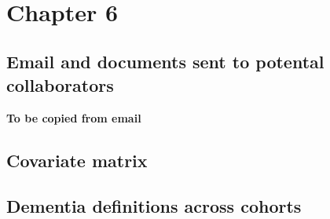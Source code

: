 \documentclass[a4paper, twoside]{templates/ociamthesis}
\begin{document}
~

\hypertarget{appendix-ipd-analysis}{%
\section{Chapter 6}\label{appendix-ipd-analysis}}

\hypertarget{ipd-email-collab}{%
\subsection{Email and documents sent to potental collaborators}\label{ipd-email-collab}}

\textbf{To be copied from email}

\hypertarget{appendix-ipd-covariate-matrix}{%
\subsection{Covariate matrix}\label{appendix-ipd-covariate-matrix}}

\hypertarget{appendix-ipd-dementia-def}{%
\subsection{Dementia definitions across cohorts}\label{appendix-ipd-dementia-def}}

~
\end{document}
